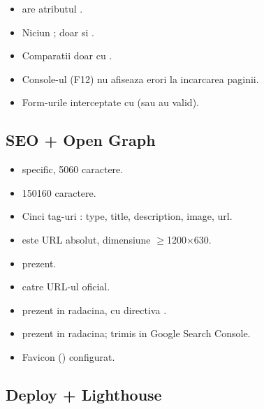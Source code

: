 \begin{itemize}[leftmargin=*, label={$\square$}, itemsep=2pt]
  \item {} are atributul .
  \item Niciun ; doar  si .
  \item Comparatii doar cu \code{===}.
  \item Console-ul (F12) nu afiseaza erori la incarcarea paginii.
  \item Form-urile interceptate cu  (sau au  valid).
\end{itemize}

\subsection*{SEO + Open Graph}

\begin{itemize}[leftmargin=*, label={$\square$}, itemsep=2pt]
  \item {} specific, 50\textendash{}60 caractere.
  \item {} 150\textendash{}160 caractere.
  \item Cinci tag-uri : type, title, description, image, url.
  \item {} este URL absolut, dimensiune $\geq$1200$\times$630.
  \item {} prezent.
  \item {} catre URL-ul oficial.
  \item {} prezent in radacina, cu directiva .
  \item {} prezent in radacina; trimis in Google Search Console.
  \item Favicon () configurat.
\end{itemize}

\subsection*{Deploy + Lighthouse}

